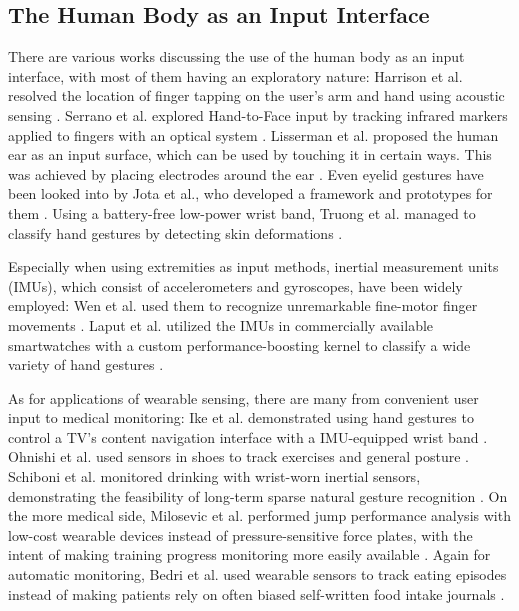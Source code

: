 \documentclass[runningheads]{llncs}
\begin{document}
\subsection{The Human Body as an Input Interface}
There are various works discussing the use of the human body as an input interface, with
most of them having an exploratory nature:
Harrison et al. resolved the location of finger tapping on the user's arm and hand
using acoustic sensing \cite{10.1145/1753326.1753394}.
Serrano et al. explored Hand-to-Face input by tracking infrared markers applied to
fingers with an optical system \cite{10.1145/2556288.2556984}.
Lisserman et al. proposed the human ear as an input surface, which can be used by
touching it in certain ways. This was achieved by placing electrodes around the ear
\cite{10.1145/2468356.2468592}.
Even eyelid gestures have been looked into by Jota et al., who developed a framework
and prototypes for them \cite{10.5555/2788890.2788938}.
Using a battery-free low-power wrist band, Truong et al. managed to classify hand
gestures by detecting skin deformations \cite{10.1145/3274783.3274854}.

Especially when using extremities as input methods, inertial measurement units (IMUs),
which consist of accelerometers and gyroscopes, have been widely employed: Wen et al.
used them to recognize unremarkable fine-motor finger movements
\cite{10.1145/2858036.2858466}. Laput et al. utilized the IMUs in commercially available
smartwatches with a custom performance-boosting kernel to classify a wide variety of hand
gestures \cite{10.1145/2984511.2984582}.

As for applications of wearable sensing, there are many from convenient user input
to medical monitoring:
Ike et al. demonstrated using hand gestures to control a TV's content navigation interface
with a IMU-equipped wrist band \cite{10.1145/2641248.2641359}.
Ohnishi et al. used sensors in shoes to track exercises and general posture
\cite{10.1145/3174910.3174938}.
Schiboni et al. monitored drinking with wrist-worn inertial sensors, demonstrating
the feasibility of long-term sparse natural gesture recognition
\cite{10.1145/3267242.3267253}.
On the more medical side, Milosevic et al. performed jump performance analysis with
low-cost wearable devices instead of pressure-sensitive force plates, with the intent
of making training progress monitoring more easily available \cite{10.1145/2753509.2753512}.
Again for automatic monitoring, Bedri et al. used wearable sensors to track
eating episodes instead of making patients rely on often biased self-written food intake
journals \cite{10.1145/3130902}.
\end{document}
